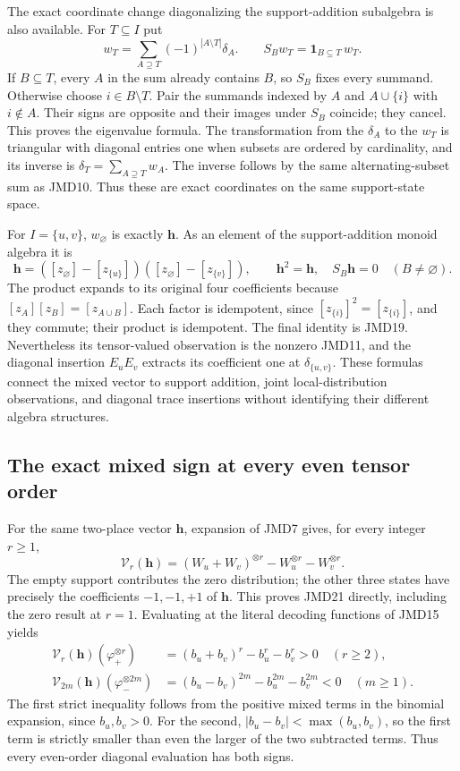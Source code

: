 \documentclass[11pt]{article}
\begin{document}
The exact coordinate change diagonalizing the support-addition
subalgebra is also available. For $T\subseteq I$ put
\[
w_T=\sum_{A\supseteq T}(-1)^{|A\setminus T|}\delta_A.
\qquad S_Bw_T=\mathbf1_{B\subseteq T}\,w_T.
\tag{JMD19}
\]
If $B\subseteq T$, every $A$ in the sum already contains $B$,
so $S_B$ fixes every summand. Otherwise choose $i\in B\setminus T$.
Pair the summands indexed by $A$ and $A\cup\{i\}$ with $i\notin A$.
Their signs are opposite and their images under $S_B$ coincide;
they cancel. This proves the eigenvalue formula.
The transformation from the $\delta_A$ to the $w_T$ is triangular
with diagonal entries one when subsets are ordered by cardinality,
and its inverse is $\delta_T=\sum_{A\supseteq T}w_A$.
The inverse follows by the same alternating-subset sum as JMD10.
Thus these are exact coordinates on the same support-state space.

For $I=\{u,v\}$, $w_\varnothing$ is exactly $\mathbf h$.
As an element of the support-addition monoid algebra it is
\[
\mathbf h=
([z_\varnothing]-[z_{\{u\}}])
([z_\varnothing]-[z_{\{v\}}]),\qquad
\mathbf h^2=\mathbf h,
\quad S_B\mathbf h=0\quad(B\ne\varnothing).
\tag{JMD20}
\]
The product expands to its original four coefficients because
$[z_A][z_B]=[z_{A\cup B}]$.
Each factor is idempotent, since $[z_{\{i\}}]^2=[z_{\{i\}}]$,
and they commute; their product is idempotent.
The final identity is JMD19.
Nevertheless its tensor-valued observation is the nonzero JMD11,
and the diagonal insertion $E_uE_v$ extracts its coefficient one
at $\delta_{\{u,v\}}$.
These formulas connect the mixed vector to support addition,
joint local-distribution observations, and diagonal trace insertions
without identifying their different algebra structures.

\subsection{The exact mixed sign at every even tensor order}
For the same two-place vector $\mathbf h$, expansion of JMD7 gives,
for every integer $r\ge1$,
\[
\mathcal V_r(\mathbf h)
 =(W_u+W_v)^{\otimes r}-W_u^{\otimes r}-W_v^{\otimes r}.
\tag{JMD21}
\]
The empty support contributes the zero distribution; the other three
states have precisely the coefficients $-1,-1,+1$ of $\mathbf h$.
This proves JMD21 directly, including the zero result at $r=1$.
Evaluating at the literal decoding functions of JMD15 yields
\[
\begin{split}
\mathcal V_r(\mathbf h)(\varphi_+^{\otimes r})
 &=(b_u+b_v)^r-b_u^r-b_v^r>0\quad(r\ge2),\\
\mathcal V_{2m}(\mathbf h)(\varphi_-^{\otimes 2m})
 &=(b_u-b_v)^{2m}-b_u^{2m}-b_v^{2m}<0\quad(m\ge1).
\end{split}
\tag{JMD22}
\]
The first strict inequality follows from the positive mixed terms in
the binomial expansion, since $b_u,b_v>0$.
For the second, $|b_u-b_v|<\max(b_u,b_v)$, so the first term is
strictly smaller than even the larger of the two subtracted terms.
Thus every even-order diagonal evaluation has both signs.
\end{document}
